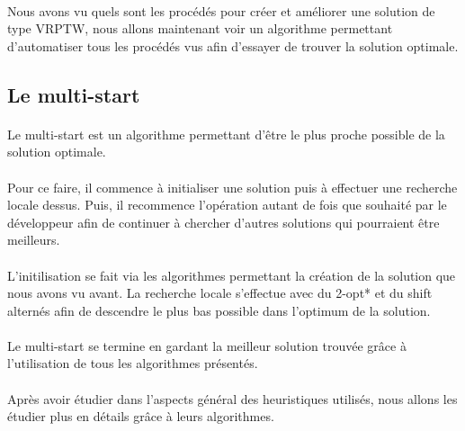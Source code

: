 \documentclass[12pt]{article}
\begin{document}
\paragraph{}
Nous avons vu quels sont les procédés pour créer et améliorer une solution de type VRPTW, nous allons maintenant voir un algorithme permettant 
d'automatiser tous les procédés vus afin d'essayer de trouver la solution optimale.

\subsection{Le multi-start}

\paragraph{}
Le multi-start est un algorithme permettant d'être le plus proche possible de la solution optimale. 

\paragraph{}
Pour ce faire, il commence à initialiser une solution puis à effectuer une recherche locale dessus. Puis, il recommence l'opération autant de fois 
que souhaité par le développeur afin de continuer à chercher d'autres solutions qui pourraient être meilleurs.

\paragraph{}
L'initilisation se fait via les algorithmes permettant la création de la solution que nous avons vu avant. La recherche locale s'effectue avec du 2-opt* 
et du shift alternés afin de descendre le plus bas possible dans l'optimum de la solution.

\paragraph{}
Le multi-start se termine en gardant la meilleur solution trouvée grâce à l'utilisation de tous les algorithmes présentés.

\paragraph{}
Après avoir étudier dans l'aspects général des heuristiques utilisés, nous allons les étudier plus en détails grâce à leurs algorithmes.
\end{document}
